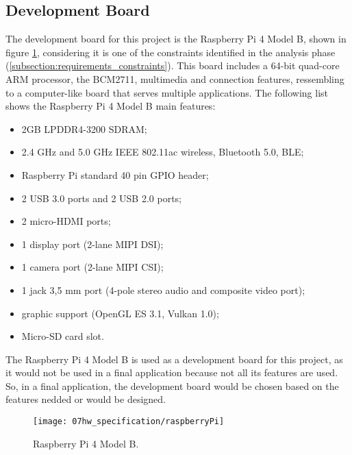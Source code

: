 \subsection{Development Board}

The development board for this project is the Raspberry Pi 4 Model B, shown in figure \ref{fig:rasp}, considering it is one of the constraints identified in the analysis phase (\ref{subsection:requirements_constraints}). This board includes a 64-bit quad-core ARM processor, the BCM2711, multimedia and connection features, ressembling to a computer-like board that serves multiple applications. The following list shows the Raspberry Pi 4 Model B main features:

\begin{itemize}
        \item 2GB LPDDR4-3200 SDRAM;
        \item 2.4 GHz and 5.0 GHz IEEE 802.11ac wireless, Bluetooth 5.0, BLE;
        \item Raspberry Pi standard 40 pin GPIO header;   
        \item 2 USB 3.0 ports and 2 USB 2.0 ports;
        \item 2 micro-HDMI ports;
        \item 1 display port (2-lane MIPI DSI);
        \item 1 camera port (2-lane MIPI CSI);
        \item 1 jack 3,5 mm port (4-pole stereo audio and composite video port);
		\item graphic support (OpenGL ES 3.1, Vulkan 1.0);
		\item Micro-SD card slot.
\end{itemize}

The Raspberry Pi 4 Model B is used as a development board for this project, as it would not be used in a final application because not all its features are used. So, in a final application, the development board would be chosen based on the features nedded or would be designed.


\begin{figure}[H]
	\centering
	\texttt{[image: 07hw\_specification/raspberryPi]}
	\caption{Raspberry Pi 4 Model B.}
	\label{fig:rasp}
\end{figure}


